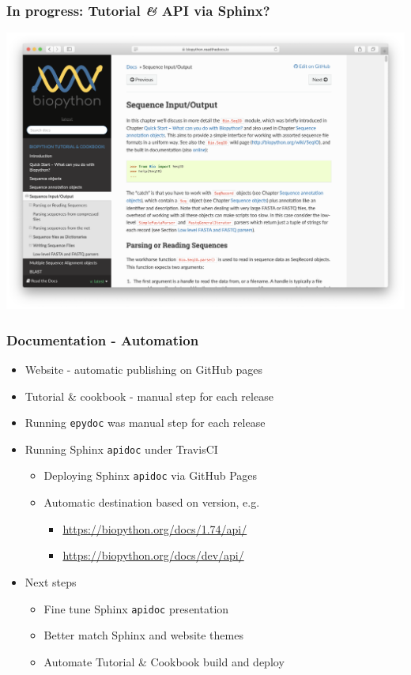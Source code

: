 \begin{frame}
\frametitle{In progress: Tutorial \textit{\&} API via Sphinx?}
\vspace{-0.8cm}
\includegraphics[width=\textwidth]{images/read-the-docs}
\end{frame}

\begin{frame}
\frametitle{Documentation - Automation}
\begin{itemize}
\item Website - automatic publishing on GitHub pages
\item Tutorial \& cookbook - manual step for each release
\item Running \texttt{epydoc} was manual step for each release
\item Running Sphinx \texttt{apidoc} under TravisCI
  \begin{itemize}
  \item Deploying Sphinx \texttt{apidoc} via GitHub Pages
  \item Automatic destination based on version, e.g.
    \begin{itemize}
    \item \url{https://biopython.org/docs/1.74/api/}
    \item \url{https://biopython.org/docs/dev/api/}
    \end{itemize}
  \end{itemize}
\item Next steps
  \begin{itemize}
  \item Fine tune Sphinx \texttt{apidoc} presentation
  \item Better match Sphinx and website themes
  \item Automate Tutorial \& Cookbook build and deploy
  \end{itemize}
\end{itemize}
\end{frame}

